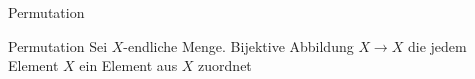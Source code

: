 \documentclass[class=article, crop=false]{standalone}
\begin{document}
\begin{zettel}{Permutation}
\begin{flashcard}[mtn8cu28]{Permutation}
	Sei $X$-endliche Menge. Bijektive Abbildung $X \to  X$ die jedem Element $X$ ein Element aus $X$ zuordnet

\end{flashcard}
\end{zettel}
\end{document}
